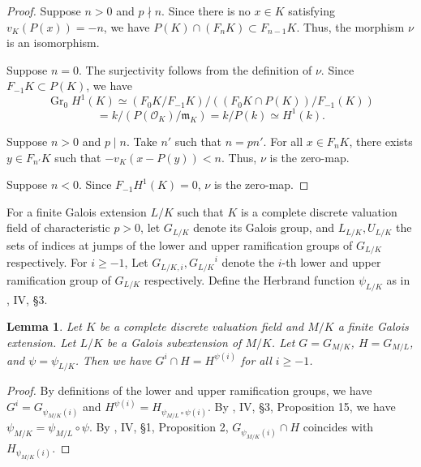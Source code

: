 \documentclass[sn-mathphys-num]{sn-jnl}
\numberwithin{equation}{section}
\newcommand{\Gr}{\operatorname{Gr}}
\theoremstyle{plain}
\newtheorem{lemm}[theo]{Lemma}
\theoremstyle{definition}
\begin{document}
\begin{proof}
  Suppose $n>0$ and $p\nmid n$. Since there is no $x\in K$ satisfying $v_K(P(x))=-n$, we have $P(K)\cap(F_nK)\subset F_{n-1}K$. Thus, the morphism $\nu$ is an isomorphism.

Suppose $n=0$. The surjectivity follows from the definition of $\nu$. Since $F_{-1}K\subset P(K)$, we have
\[
\Gr_0H^1(K)\simeq (F_0K/F_{-1}K)/((F_0K\cap P(K))/F_{-1}(K))
\]
\begin{equation}
=k/(P(\mathcal{O}_K)/\mathfrak{m}_K)=k/P(k)\simeq H^1(k).
\end{equation}


Suppose $n>0$ and $p\mid n$. Take $n'$ such that $n=pn'$. For all $x\in F_nK$, there exists $y\in F_{n'}K$ such that $-v_K(x-P(y))<n$. Thus, $\nu$ is the zero-map.

Suppose $n<0$. Since $F_{-1}H^1(K)=0$, $\nu$ is the zero-map.
\end{proof}

For a finite Galois extension $L/K$ such that $K$ is a complete discrete valuation field of characteristic $p>0$, let $G_{L/K}$ denote its Galois group, and $L_{L/K},U_{L/K}$ the sets of indices at jumps of the lower and upper ramification groups of $G_{L/K}$ respectively. For $i\geq -1$, Let $G_{L/K,i},{G_{L/K}}^i$ denote the $i$-th lower and upper ramification group of $G_{L/K}$ respectively. Define the Herbrand function $\psi_{L/K}$ as in \cite{Se}, IV, \S 3.

\begin{lemm}\label{lab}
  Let $K$ be a complete discrete valuation field and $M/K$ a finite Galois extension. Let $L/K$ be a Galois subextension of $M/K$. Let $G=G_{M/K}$, $H=G_{M/L}$, and $\psi=\psi_{L/K}$. Then we have $G^i\cap H=H^{\psi(i)}$ for all $i\geq -1$.
\end{lemm}
\begin{proof} By definitions of the lower and upper ramification groups, we have $G^{i}=G_{\psi_{M/K}(i)}$ and $H^{\psi(i)}=H_{\psi_{M/L}\circ\psi(i)}$. By \cite{Se}, IV, \S 3, Proposition 15, we have $\psi_{M/K}=\psi_{M/L}\circ\psi$. By \cite{Se}, IV, \S 1, Proposition 2, $G_{\psi_{M/K}(i)}\cap H$ coincides with $H_{\psi_{M/K}(i)}$.
\end{proof}
\end{document}
